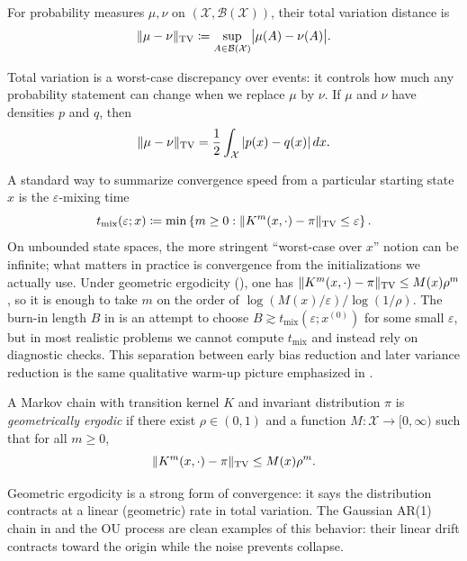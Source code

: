 \begin{definition}
\label{def:tv-distance}
For probability measures $\mu,\nu$ on $(\mathcal{X},\mathcal{B}(\mathcal{X}))$, their total variation distance is
\[
\lVert\mu-\nu\rVert_{\mathrm{TV}} \coloneqq \sup_{A\in\mathcal{B}(\mathcal{X})}\bigl|\mu(A)-\nu(A)\bigr|.
\]
\end{definition}

Total variation is a worst-case discrepancy over events: it controls how much any probability statement can change when we replace $\mu$ by $\nu$.
If $\mu$ and $\nu$ have densities $p$ and $q$, then
\[
\lVert\mu-\nu\rVert_{\mathrm{TV}} = \frac12\int_{\mathcal{X}} |p(x)-q(x)|\,dx.
\]

A standard way to summarize convergence speed from a particular starting state $x$ is the $\varepsilon$-mixing time
\[
t_{\mathrm{mix}}(\varepsilon;x) \coloneqq \min\left\{m\ge 0:\lVert K^m(x,\cdot)-\pi\rVert_{\mathrm{TV}}\le \varepsilon\right\}.
\]
On unbounded state spaces, the more stringent ``worst-case over $x$'' notion can be infinite; what matters in practice is convergence from the initializations we actually use.
Under geometric ergodicity (), one has
$\lVert K^m(x,\cdot)-\pi\rVert_{\mathrm{TV}}\le M(x)\rho^m$, so it is enough to take $m$ on the order of $\log(M(x)/\varepsilon)/\log(1/\rho)$.
The burn-in length $B$ in  is an attempt to choose $B\gtrsim t_{\mathrm{mix}}(\varepsilon;x^{(0)})$ for some small $\varepsilon$, but in most realistic problems we cannot compute $t_{\mathrm{mix}}$ and instead rely on diagnostic checks.
This separation between early bias reduction and later variance reduction is the same qualitative warm-up picture emphasized in \citet[\S2.2, pp.~11--12]{betancourt_2017_hmc_conceptual}.

\begin{definition}
\label{def:geometric-ergodicity}
A Markov chain with transition kernel $K$ and invariant distribution $\pi$ is \emph{geometrically ergodic} if there exist $\rho\in(0,1)$ and a function $M:\mathcal{X}\to[0,\infty)$ such that for all $m\ge 0$,
\[
\lVert K^m(x,\cdot)-\pi\rVert_{\mathrm{TV}} \le M(x)\rho^m.
\]
\end{definition}

Geometric ergodicity is a strong form of convergence: it says the distribution contracts at a linear (geometric) rate in total variation.
The Gaussian AR(1) chain in  and the OU process are clean examples of this behavior: their linear drift contracts toward the origin while the noise prevents collapse.

